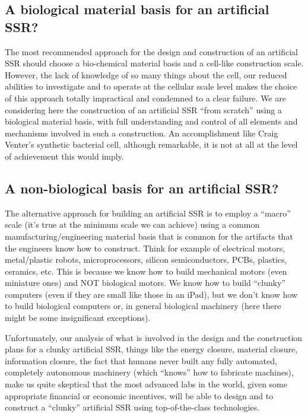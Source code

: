 \subsection{A biological material basis for an artificial SSR?}

The most recommended approach for the design and construction of an
artificial SSR should choose a bio-chemical material basis and a
cell-like construction scale. However, the lack of knowledge of so many
things about the cell, our reduced abilities to investigate and to
operate at the cellular scale level makes the choice of this approach
totally impractical and condemned to a clear failure. We are
considering here the construction of an artificial SSR “from scratch”
using a biological material basis, with full understanding and control
of all elements and mechanisms involved in such a construction. An
accomplishment like Craig Venter’s synthetic bacterial cell, although
remarkable, it is not at all at the level of achievement this would
imply.

\subsection{A non-biological basis for an artificial SSR?}

The alternative approach for building an artificial SSR is to employ a
“macro” scale (it’s true at the minimum scale we can achieve) using a
common manufacturing/engineering material basis that is common for the
artifacts that the engineers know how to construct. Think for example
of electrical motors, metal/plastic robots, microprocessors, silicon
semiconductors, PCBs, plastics, ceramics, etc. This is because we know
how to build mechanical motors (even miniature ones) and NOT biological
motors. We know how to build “clunky” computers (even if they are small
like those in an iPad), but we don’t know how to build biological
computers or, in general biological machinery (here there might be some
insignificant exceptions).

Unfortunately, our analysis of what is involved in  the design and the
construction plans for a clunky artificial SSR, things like the energy
closure, material closure, information closure, the fact that humans
never built any fully automated, completely autonomous machinery (which
“knows” how to fabricate machines), make us quite skeptical that the
most advanced labs in the world, given some appropriate financial or
economic incentives, will be able to design and to construct a “clunky”
 artificial SSR using top-of-the-class technologies.

